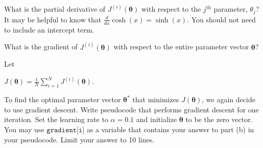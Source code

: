 \documentclass[11pt,addpoints,answers]{exam}
\begin{document}
\begin{questions}
\begin{parts}
    \clearpage
    \begin{subparts}
        \subpart[3] 
         What is the partial derivative of $J^{(i)}(\bm\theta)$ with respect to the $j^{\textrm{th}}$ parameter, $\theta_j$? It may be helpful to know that $\frac{d}{dx}\cosh(x) = \sinh(x)$. You should not need to include an intercept term. 
         
        \begin{your_solution}[title=Your answer:,height=6cm,width=15cm]
        \end{your_solution}
        
        \subpart[2] 
         What is the gradient of $J^{(i)}(\bm\theta)$ with respect to the entire parameter vector $\bm\theta$?
         
        \begin{your_solution}[title=Your answer:,height=4cm,width=15cm]
        \end{your_solution}
        
        \subpart[2] Let 
        
        \begin{center} $J(\bm\theta) = \frac1N \sum\limits_{i=1}^{N} J^{(i)}(\bm\theta).$ 
        \end{center}
        
        To find the optimal parameter vector $\bm\theta^*$ that minimizes $J(\bm\theta)$, we again decide to use gradient descent. Write pseudocode that performs gradient descent for one iteration. Set the learning rate to $\alpha = 0.1$ and initialize $\bm\theta$ to be the zero vector. You may use $\texttt{gradient[i]}$ as a variable that contains your answer to part (b) in your pseudocode. Limit your answer to 10 lines.

        \begin{your_solution}[title=Your Answer,height=5.5cm,width=15cm]
            
        \begin{your_code_solution}

        \end{your_code_solution}
            
        \end{your_solution}
        
        
    \end{subparts}
    
\end{parts}



\end{questions}
\end{document}
